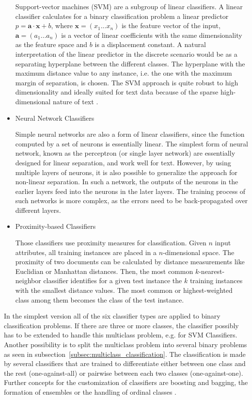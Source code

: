 \documentclass[article,type=msc,colorback,accentcolor=tud7b]{tudthesis}
\begin{document}
\begin{itemize}
        Support-vector machines (SVM) are a subgroup of linear classifiers. A linear classifier calculates for a binary classification problem a linear predictor $p= \mathbf{a}\cdot\mathbf{x}+b$, where $\mathbf{x}=(x_{1}...x_{n})$ is the feature vector of the input, $\mathbf{a}=(a_{1}...a_{n})$ is a vector of linear coefficients with the same dimensionality as the feature space and $b$ is a displacement constant. A natural interpretation of the linear predictor in the discrete scenario would be as a separating hyperplane between the different classes. The hyperplane with the maximum distance value to any instance, i.e. the one with the maximum margin of separation, is chosen. The SVM approach is quite robust to high dimensionality and ideally suited for text data because of the sparse high-dimensional nature of text \autocite{Joachims1997}.
      \item Neural Network Classifiers
      
        Simple neural networks are also a form of linear classifiers, since the function computed by a set of neurons is essentially linear. The simplest form of neural network, known as the perceptron (or single layer network) are essentially designed for linear separation, and work well for text. However, by using multiple layers of neurons, it is also possible to generalize the approach for non-linear separation. In such a network, the outputs of the neurons in the earlier layers feed into the neurons in the later layers. The training process of such networks is more complex, as the errors need to be back-propagated over different layers.
      \item Proximity-based Classifiers
      
        Those classifiers use proximity measures for classification. Given $n$ input attributes, all training instances are placed in a $n$-dimensional space. The proximity of two documents can be calculated by distance measurements like Euclidian or Manhattan distances. Then, the most common $k$-nearest-neighbor classifier identifies for a given test instance the $k$ training instances with the smallest distance values. The most common or highest-weighted class among them becomes the class of the test instance.
    \end{itemize}
    In the simplest version all of the six classifier types are applied to binary classification problems. If there are three or more classes, the classifier possibly has to be extended to handle this multiclass problem, e.g. for SVM Classifiers. Another possibility is to split the multiclass problem into several binary problems as seen in subsection~\ref{subsec:multiclass_classification}. The classification is made by several classifiers that are trained to differentiate either between one class and the rest (one-against-all) or pairwise between each two classes (one-against-one). Further concepts for the customization of classifiers are boosting and bagging, the formation of ensembles or the handling of ordinal classes \autocite{Aggarwal2012}. \\\\
\end{document}
